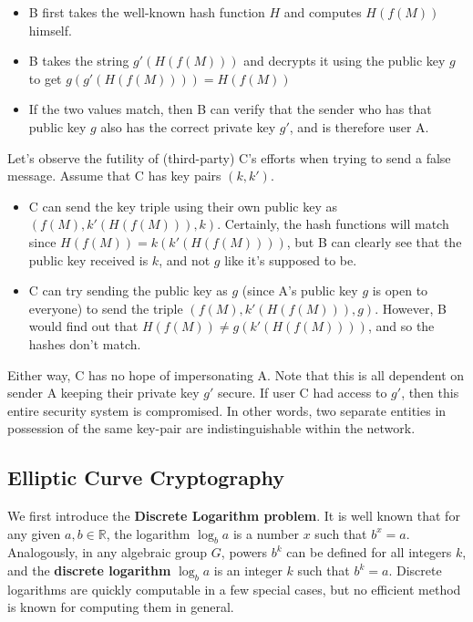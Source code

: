 \documentclass{article}
\begin{document}
    \begin{itemize}
      \item B first takes the well-known hash function $H$ and computes $H(f(M))$ himself.
      \item B takes the string $g'(H(f(M)))$ and decrypts it using the public key $g$ to get $g(g'(H(f(M)))) = H(f(M))$
      \item If the two values match, then B can verify that the sender who has that public key $g$ also has the correct private key $g'$, and is therefore user A.
    \end{itemize}

    Let's observe the futility of (third-party) C's efforts when trying to send a false message. Assume that C has key pairs $(k, k')$.

    \begin{itemize}
      \item C can send the key triple using their own public key as $(f(M), k'(H(f(M))), k)$. Certainly, the hash functions will match since $H(f(M)) = k(k'(H(f(M))))$, but B can clearly see that the public key received is $k$, and not $g$ like it's supposed to be.
      \item C can try sending the public key as $g$ (since A's public key $g$ is open to everyone) to send the triple $(f(M), k'(H(f(M))), g)$. However, B would find out that $H(f(M)) \neq g(k'(H(f(M))))$, and so the hashes don't match.
    \end{itemize}

    Either way, C has no hope of impersonating A. Note that this is all dependent on sender A keeping their private key $g'$ secure. If user C had access to $g'$, then this entire security system is compromised. In other words, two separate entities in possession of the same key-pair are indistinguishable within the network.

  \subsection{Elliptic Curve Cryptography}

    We first introduce the \textbf{Discrete Logarithm problem}. It is well known that for any given $a, b \in \mathbb{R}$, the logarithm $\log_b a$ is a number $x$ such that $b^x = a$. Analogously, in any algebraic group $G$, powers $b^k$ can be defined for all integers $k$, and the \textbf{discrete logarithm} $\log_b a$ is an integer $k$ such that $b^k = a$. Discrete logarithms are quickly computable in a few special cases, but no efficient method is known for computing them in general.
\end{document}

